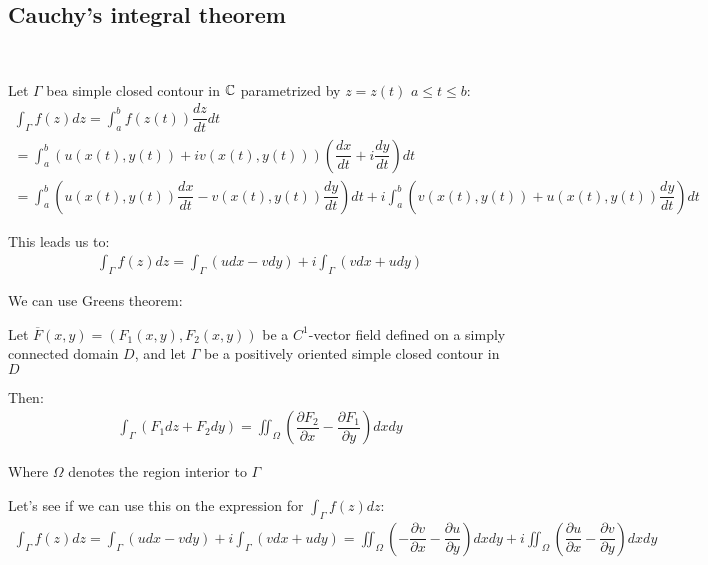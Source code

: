 \subsection{Cauchy's integral theorem}\hfill\\\par
\noindent Let $\Gamma$ bea  simple closed contour in $\mathbb{C}$ parametrized by $z = z(t)$ $a\leq t\leq b$:
\begin{equation*}
  \begin{gathered}
    \int_{\Gamma}f(z)dz = \int_{a}^{b}f(z(t))\dfrac{dz}{dt}dt\\
    = \int_{a}^{b}(u(x(t),y(t))+iv(x(t), y(t)))\left(\dfrac{dx}{dt}+i\dfrac{dy}{dt}\right)dt\\
    = \int_{a}^{b}\left(u(x(t),y(t))\dfrac{dx}{dt}-v(x(t),y(t))\dfrac{dy}{dt}\right)dt+i\int_{a}^{b}(v(x(t),y(t))+u(x(t),y(t))\dfrac{dy}{dt})dt
  \end{gathered}
\end{equation*}\par
\noindent This leads us to:
\begin{equation*}
  \begin{gathered}
    \int_{\Gamma}f(z)dz = \int_{\Gamma}(udx-vdy)+i\int_{\Gamma}(vdx+udy)
  \end{gathered}
\end{equation*}
\par\bigskip
\noindent We can use Greens theorem:
\par\bigskip
\begin{theo}{}
  Let $\overline{F}(x,y) = (F_1(x,y),F_2(x,y))$ be a $C^1$-vector field defined on a simply connected domain $D$, and let $\Gamma$ be a positively oriented simple closed contour in $D$
  \par\bigskip
  \noindent Then:
  \begin{equation*}
    \begin{gathered}
      \int_{\Gamma}(F_1dz+F_2dy) = \iint_{\Omega}\left(\dfrac{\partial F_2}{\partial x}-\dfrac{\partial F_1}{\partial y}\right)dxdy
    \end{gathered}
  \end{equation*}
  \par\bigskip
  \noindent Where $\Omega$ denotes the region interior to $\Gamma$
\end{theo}
\par\bigskip
\noindent Let's see if we can use this on the expression for $\int_{\Gamma}f(z)dz$:
\begin{equation*}
  \begin{gathered}
    \int_{\Gamma}f(z)dz = \int_{\Gamma}(udx-vdy)+i\int_{\Gamma}(vdx+udy) = \iint_{\Omega}\left(-\dfrac{\partial v}{\partial x}-\dfrac{\partial u}{\partial y}\right)dxdy + i\iint_{\Omega}\left(\dfrac{\partial u}{\partial x}-\dfrac{\partial v}{\partial y}\right)dxdy
  \end{gathered}
\end{equation*}
